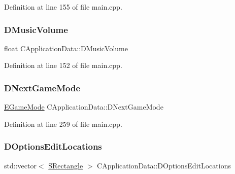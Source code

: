 Definition at line 155 of file main.\+cpp.

\hypertarget{classCApplicationData_a8bc61af4a83a667102e55cca2a739c3b}{}\label{classCApplicationData_a8bc61af4a83a667102e55cca2a739c3b} 
\subsubsection{\texorpdfstring{D\+Music\+Volume}{DMusicVolume}}
{\footnotesize\ttfamily float C\+Application\+Data\+::\+D\+Music\+Volume\hspace{0.3cm}{\ttfamily [protected]}}



Definition at line 152 of file main.\+cpp.

\hypertarget{classCApplicationData_a3b67edeacd70201dcf96fa9fa8aa2107}{}\label{classCApplicationData_a3b67edeacd70201dcf96fa9fa8aa2107} 
\subsubsection{\texorpdfstring{D\+Next\+Game\+Mode}{DNextGameMode}}
{\footnotesize\ttfamily \hyperlink{classCApplicationData_ac8ac37a4c8bb871036fbbdc6a072e403}{E\+Game\+Mode} C\+Application\+Data\+::\+D\+Next\+Game\+Mode\hspace{0.3cm}{\ttfamily [protected]}}



Definition at line 259 of file main.\+cpp.

\hypertarget{classCApplicationData_ab4e6804c6e50cca45ab3c3071588da34}{}\label{classCApplicationData_ab4e6804c6e50cca45ab3c3071588da34} 
\subsubsection{\texorpdfstring{D\+Options\+Edit\+Locations}{DOptionsEditLocations}}
{\footnotesize\ttfamily std\+::vector$<$ \hyperlink{structSRectangle}{S\+Rectangle} $>$ C\+Application\+Data\+::\+D\+Options\+Edit\+Locations\hspace{0.3cm}{\ttfamily [protected]}}



